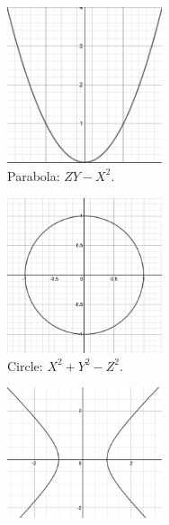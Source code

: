 \documentclass[12pt]{article}
\theoremstyle{definition}
\begin{document}
\begin{figure}[H]
 
    \begin{subfigure}{0.5\textwidth}
        \centering
        \includegraphics[width=0.5\textwidth]{36.png}
        \caption{Parabola: $ZY-X^2$.}
        \label{fig:subim1}
    \end{subfigure}
    \hfill
    \begin{subfigure}{0.5\textwidth}
        \centering
        \includegraphics[width=0.5\textwidth]{37.png}
        \caption{Circle: $X^2+Y^2-Z^2$.}
        \label{fig:subim2}
    \end{subfigure}
    \vspace{1 cm}
    \begin{subfigure}{0.5\textwidth}
        \centering
        \includegraphics[width=0.5\textwidth]{38.png}

\end{subfigure}
\end{figure}
\end{document}
